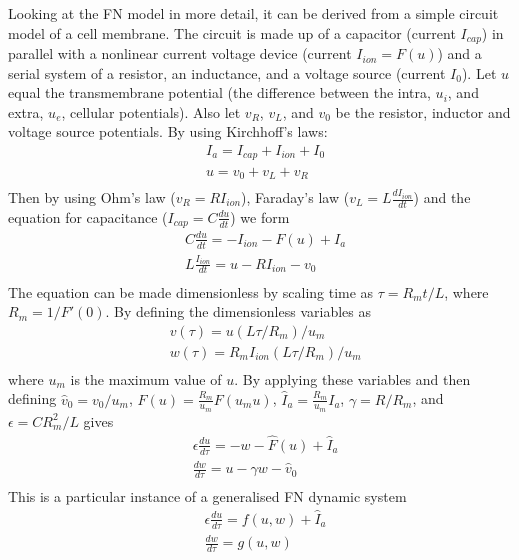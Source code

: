 Looking at the FN model in more detail, it can be derived from a simple circuit model of a cell membrane. The circuit is made up of a capacitor (current $I_{cap}$) in parallel with a nonlinear current voltage device (current $I_{ion} = F(u)$) and a serial system of a resistor, an inductance, and a voltage source (current $I_0$). Let $u$ equal the transmembrane potential (the difference between the intra, $u_i$, and extra, $u_e$, cellular potentials). Also let $v_R$, $v_L$, and $v_0$ be the resistor, inductor and voltage source potentials. By using Kirchhoff's laws:
\begin{equation}
    \begin{split}
        & I_a = I_{cap} + I_{ion} + I_0 \\
        & u = v_0 + v_L + v_R \\
    \end{split}
\end{equation}
Then by using Ohm's law ($v_R=RI_{ion}$), Faraday's law ($v_L=L\frac{dI_{ion}}{dt}$) and the equation for capacitance ($I_{cap}=C\frac{du}{dt}$) we form
\begin{equation}
    \begin{split}
        & C\frac{du}{dt} = -I_{ion} -F(u) +I_a \\
        & L\frac{I_{ion}}{dt} = u - RI_{ion} - v_0 \\
    \end{split}
\end{equation}
The equation can be made dimensionless by scaling time as $\tau=R_mt/L$, where $R_m=1/F'(0)$. By defining the dimensionless variables as
\begin{equation}
    \begin{split}
        & v(\tau)=u(L\tau/R_m)/u_m \\
        & w(\tau)=R_mI_{ion}(L\tau/R_m)/u_m \\
    \end{split}
\end{equation}
where $u_m$ is the maximum value of $u$. By applying these variables and then defining $\hat v_0=v_0/u_m$, $\hat F(u)=\frac{R_m}{u_m}F(u_mu)$, $\hat I_a=\frac{R_m}{u_m}I_a$, $\gamma = R/R_m$, and $\epsilon = CR^{2}_{m}/L$ gives
\begin{equation}
    \begin{split}
        & \epsilon\frac{du}{d\tau} = -w - \hat F(u) + \hat I_a \\
        & \frac{dw}{d\tau} = u - \gamma w - \hat v_0 \\
    \end{split}
\end{equation}
This is a particular instance of a generalised FN dynamic system
\begin{equation}
    \begin{split}
        & \epsilon\frac{du}{d\tau}=f(u,w) + \hat I_a \\
        & \frac{dw}{d\tau} = g(u,w) \\
    \end{split}
    \label{eqGFN}
\end{equation}

